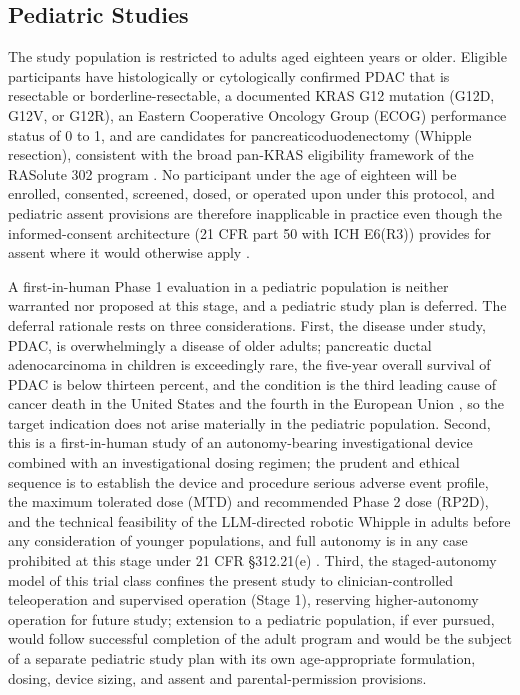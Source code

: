 \subsection{Pediatric Studies}

The study population is restricted to adults aged eighteen years or older. Eligible
participants have histologically or cytologically confirmed PDAC that is resectable
or borderline-resectable, a documented KRAS G12 mutation (G12D, G12V, or G12R), an
Eastern Cooperative Oncology Group (ECOG) performance status of 0 to 1, and are
candidates for pancreaticoduodenectomy (Whipple resection), consistent with the
broad pan-KRAS eligibility framework of the RASolute 302 program
\cite{daraxwhipple}. No participant under the age of eighteen will be enrolled,
consented, screened, dosed, or operated upon under this protocol, and pediatric
assent provisions are therefore inapplicable in practice even though the
informed-consent architecture (21 CFR part 50 with ICH E6(R3)) provides for assent
where it would otherwise apply \cite{cfr050paiuni}.

A first-in-human Phase 1 evaluation in a pediatric population is neither warranted
nor proposed at this stage, and a pediatric study plan is deferred. The deferral
rationale rests on three considerations. First, the disease under study, PDAC, is
overwhelmingly a disease of older adults; pancreatic ductal adenocarcinoma in
children is exceedingly rare, the five-year overall survival of PDAC is below
thirteen percent, and the condition is the third leading cause of cancer death in
the United States and the fourth in the European Union \cite{pdac060s2030}, so the
target indication does not arise materially in the pediatric population. Second,
this is a first-in-human study of an autonomy-bearing investigational device
combined with an investigational dosing regimen; the prudent and ethical sequence
is to establish the device and procedure serious adverse event profile, the maximum
tolerated dose (MTD) and recommended Phase 2 dose (RP2D), and the technical
feasibility of the LLM-directed robotic Whipple in adults before any consideration
of younger populations, and full autonomy is in any case prohibited at this stage
under 21 CFR \S 312.21(e) \cite{cfr312paiuni}. Third, the staged-autonomy model of
this trial class confines the present study to clinician-controlled teleoperation
and supervised operation (Stage 1), reserving higher-autonomy operation for future
study; extension to a pediatric population, if ever pursued, would follow successful
completion of the adult program and would be the subject of a separate pediatric
study plan with its own age-appropriate formulation, dosing, device sizing, and
assent and parental-permission provisions.

